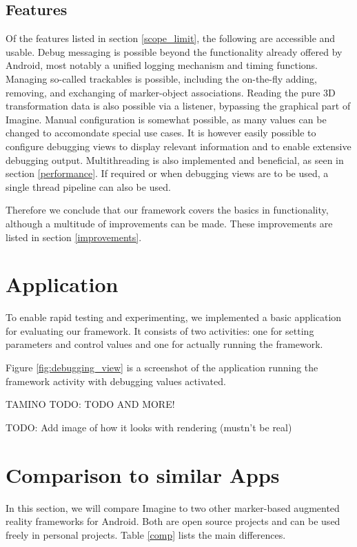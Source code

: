 \subsection{Features}

Of the features listed in section \ref{scope_limit}, the following are accessible and usable.
Debug messaging is possible beyond the functionality already offered by Android, most notably a unified logging mechanism and timing functions.
Managing so-called trackables is possible, including the on-the-fly adding, removing, and exchanging of marker-object associations.
Reading the pure 3D transformation data is also possible via a listener, bypassing the graphical part of Imagine.
Manual configuration is somewhat possible, as many values can be changed to accomondate special use cases.
It is however easily possible to configure debugging views to display relevant information and to enable extensive debugging output.
Multithreading is also implemented and beneficial, as seen in section \ref{performance}.
If required or when debugging views are to be used, a single thread pipeline can also be used.

Therefore we conclude that our framework covers the basics in functionality, although a multitude of improvements can be made.
These improvements are listed in section \ref{improvements}.

\section{Application}

To enable rapid testing and experimenting, we implemented a basic application for evaluating our framework.
It consists of two activities: one for setting parameters and control values and one for actually running the framework.

Figure \ref{fig:debugging_view} is a screenshot of the application running the framework activity with debugging values activated.

TAMINO TODO: TODO AND MORE!

TODO: Add image of how it looks with rendering (mustn't be real)

\section{Comparison to similar Apps}

In this section, we will compare Imagine to two other marker-based augmented reality frameworks for Android.
Both are open source projects and can be used freely in personal projects.
Table \ref{comp} lists the main differences.


